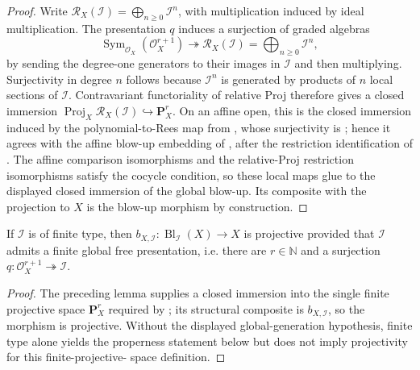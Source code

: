 \begin{proof}
  Write \(\mathcal R_X(\mathcal I)=\bigoplus_{n\geq0}\mathcal I^n\), with
  multiplication induced by ideal multiplication.  The presentation \(q\)
  induces a surjection of graded algebras
  \[
    \operatorname{Sym}_{\mathcal O_X}(\mathcal O_X^{r+1})
      \twoheadrightarrow
    \mathcal R_X(\mathcal I)=\bigoplus_{n\geq0}\mathcal I^n,
  \]
  by sending the degree-one generators to their images in \(\mathcal I\) and
  then multiplying.  Surjectivity in degree \(n\) follows because
  \(\mathcal I^n\) is generated by products of \(n\) local sections of
  \(\mathcal I\).  Contravariant functoriality of relative Proj therefore
  gives a closed immersion
  \(\operatorname{Proj}_X\mathcal R_X(\mathcal I)\hookrightarrow\mathbf P^r_X\).
  On an affine open, this is the closed immersion induced by the
  polynomial-to-Rees map from
  , whose surjectivity is
  ; hence it agrees with the affine blow-up
  embedding of , after
  the restriction identification of .
  The affine
  comparison isomorphisms and the relative-Proj restriction isomorphisms
  satisfy the cocycle condition, so these local maps glue to the displayed
  closed immersion of the global blow-up.  Its composite with the projection
  to \(X\) is the blow-up morphism by construction.
\end{proof}

\begin{theorem}
  \label{thm:nagata-global-blowup-projective}

  If \(\mathcal I\) is of finite type, then
  \(b_{X,\mathcal I}\colon\operatorname{Bl}_{\mathcal I}(X)\to X\) is
  projective provided that \(\mathcal I\) admits a finite global free
  presentation, i.e. there are \(r\in\mathbb N\) and a surjection
  \(q\colon\mathcal O_X^{r+1}\twoheadrightarrow\mathcal I\).
\end{theorem}

\begin{proof}
  The preceding lemma supplies a closed immersion into the single finite
  projective space \(\mathbf P^r_X\) required by
  ; its structural composite is
  \(b_{X,\mathcal I}\), so the morphism is projective.  Without the displayed
  global-generation hypothesis, finite type alone yields the properness
  statement below but does not imply projectivity for this finite-projective-
  space definition.
\end{proof}


